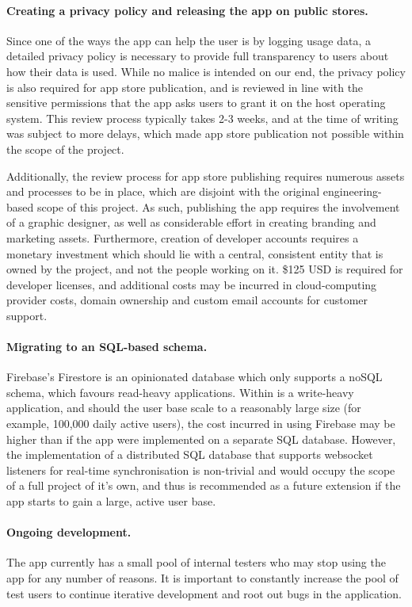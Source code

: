 \paragraph{Creating a privacy policy and releasing the app on public stores.} Since one of the ways the app can help the user is by logging usage data, a detailed privacy policy is necessary to provide full transparency to users about how their data is used. While no malice is intended on our end, the privacy policy is also required for app store publication, and is reviewed in line with the sensitive permissions that the app asks users to grant it on the host operating system. This review process typically takes 2-3 weeks, and at the time of writing was subject to more delays, which made app store publication not possible within the scope of the project.

Additionally, the review process for app store publishing requires numerous assets and processes to be in place, which are disjoint with the original engineering-based scope of this project. As such, publishing the app requires the involvement of a graphic designer, as well as considerable effort in creating branding and marketing assets. Furthermore, creation of developer accounts requires a monetary investment which should lie with a central, consistent entity that is owned by the project, and not the people working on it. \$125 USD is required for developer licenses, and additional costs may be incurred in cloud-computing provider costs, domain ownership and custom email accounts for customer support.

\paragraph{Migrating to an SQL-based schema.} Firebase's Firestore is an opinionated database which only supports a noSQL schema, which favours read-heavy applications. Within is a write-heavy application, and should the user base scale to a reasonably large size (for example, 100,000 daily active users), the cost incurred in using Firebase may be higher than if the app were implemented on a separate SQL database. However, the implementation of a distributed SQL database that supports websocket listeners for real-time synchronisation is non-trivial and would occupy the scope of a full project of it's own, and thus is recommended as a future extension if the app starts to gain a large, active user base.

\paragraph{Ongoing development.} The app currently has a small pool of internal testers who may stop using the app for any number of reasons. It is important to constantly increase the pool of test users to continue iterative development and root out bugs in the application.

